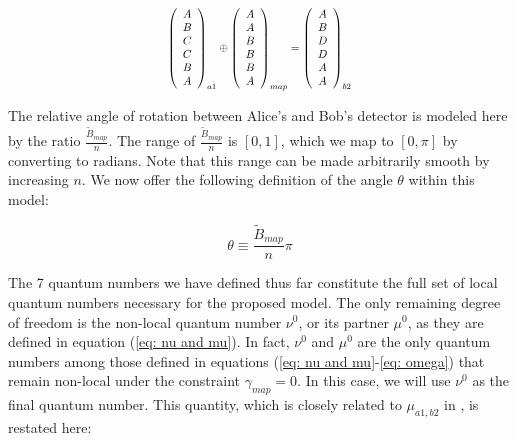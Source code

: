 \documentclass{article}
\begin{document}
\begin{equation}
\scalebox{0.8}{$\begin{aligned}
\left(\begin{array}{c}
A\\
B\\
C\\
C\\
B\\
A
\end{array}\right)_{a1}\oplus\left(\begin{array}{c}
A\\
A\\
B\\
B\\
B\\
A
\end{array}\right)_{map}=\left(\begin{array}{c}
A\\
B\\
D\\
D\\
A\\
A
\end{array}\right)_{b2}\label{eq: rotation map}
\end{aligned}$}
\end{equation}

The relative angle of rotation between Alice's and Bob's detector is modeled here by the ratio $\frac{\tilde{B}_{map}}{n}$. The range of $\frac{\tilde{B}_{map}}{n}$ is $[0,1]$, which we map to $[0,\pi]$ by converting to radians. Note that this range can be made arbitrarily smooth by increasing $n$. We now offer the following definition of the angle $\theta$ within this model: 

\begin{equation}
    \theta \equiv \frac{\tilde{B}_{map}}{n} \pi
    \label{eq: theta}
\end{equation}

The 7 quantum numbers we have defined thus far constitute the full set of local quantum numbers necessary for the proposed model. The only remaining degree of freedom is the non-local quantum number $\nu^0$, or its partner $\mu^0$, as they are defined in equation (\ref{eq: nu and mu}). In fact, $\nu^0$ and $\mu^0$ are the only quantum numbers among those defined in equations (\ref{eq: nu and mu}-\ref{eq: omega}) that remain non-local under the constraint $\gamma_{map}=0$. In this case, we will use $\nu^0$ as the final quantum number. This quantity, which is closely related to $\mu_{a1,b2}$ in \cite{Powers2023}, is restated here:
\end{document}
